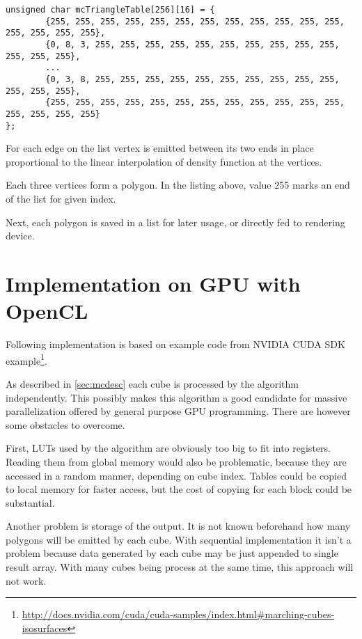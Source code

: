 \begin{lstlisting}[caption={Index to edge list LUT. Notice that for indices 0
and 255 no geometry is emitted}]
unsigned char mcTriangleTable[256][16] = {
        {255, 255, 255, 255, 255, 255, 255, 255, 255, 255, 255, 255, 255, 255, 255, 255},
        {0, 8, 3, 255, 255, 255, 255, 255, 255, 255, 255, 255, 255, 255, 255, 255},
        ...
        {0, 3, 8, 255, 255, 255, 255, 255, 255, 255, 255, 255, 255, 255, 255, 255},
        {255, 255, 255, 255, 255, 255, 255, 255, 255, 255, 255, 255, 255, 255, 255, 255}
};
\end{lstlisting}

For each edge on the list vertex is emitted between its two ends in place
proportional to the linear interpolation of density function at the vertices.

Each three vertices form a polygon. In the listing above, value 255 marks an end
of the list for given index.

Next, each polygon is saved in a list for later usage, or directly fed to
rendering device.

\section{Implementation on GPU with OpenCL}
\label{sec:mcgpu}
Following implementation is based on example code from NVIDIA CUDA SDK
example\footnote{\url{http://docs.nvidia.com/cuda/cuda-samples/index.html\#marching-cubes-isosurfaces}}.

As described in \autoref{sec:mcdesc} each cube is processed by the algorithm
independently. This possibly makes this algorithm a good candidate for massive
parallelization offered by general purpose GPU programming. There are however
some obstacles to overcome.

First, LUTs used by the algorithm are obviously too big to fit into registers.
Reading them from global memory would also be problematic, because they are
accessed in a random manner, depending on cube index. Tables could be copied
to local memory for faster access, but the cost of copying for each block could
be substantial.

Another problem is storage of the output. It is not known beforehand how many
polygons will be emitted by each cube. With sequential implementation it isn't a
problem because data generated by each cube may be just appended to single
result array. With many cubes being process at the same time, this approach
will not work.

